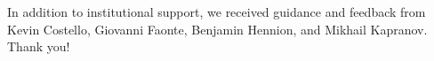In addition to institutional support, we received guidance and feedback from Kevin Costello, Giovanni Faonte, Benjamin Hennion, and Mikhail Kapranov. Thank you!

%
%

